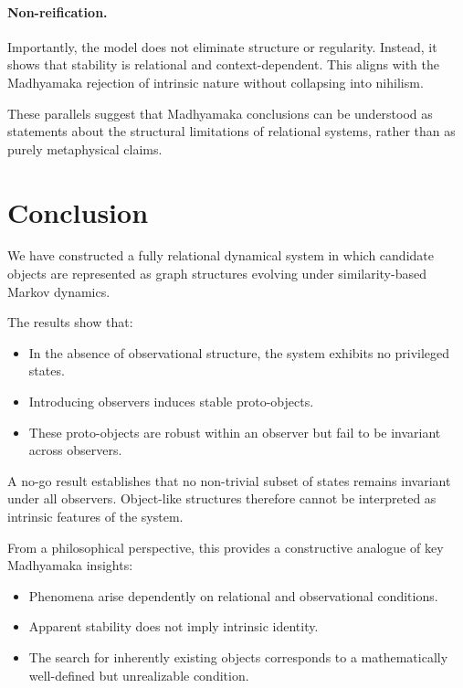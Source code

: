 \documentclass[11pt]{article}
\begin{document}
\paragraph{Non-reification.}
Importantly, the model does not eliminate structure or regularity. Instead, it shows that stability is relational and context-dependent. This aligns with the Madhyamaka rejection of intrinsic nature without collapsing into nihilism.

These parallels suggest that Madhyamaka conclusions can be understood as statements about the structural limitations of relational systems, rather than as purely metaphysical claims.

\section{Conclusion}

We have constructed a fully relational dynamical system in which candidate objects are represented as graph structures evolving under similarity-based Markov dynamics.

The results show that:

\begin{itemize}
    \item In the absence of observational structure, the system exhibits no privileged states.
    \item Introducing observers induces stable proto-objects.
    \item These proto-objects are robust within an observer but fail to be invariant across observers.
\end{itemize}

A no-go result establishes that no non-trivial subset of states remains invariant under all observers. Object-like structures therefore cannot be interpreted as intrinsic features of the system.

From a philosophical perspective, this provides a constructive analogue of key Madhyamaka insights:

\begin{itemize}
    \item Phenomena arise dependently on relational and observational conditions.
    \item Apparent stability does not imply intrinsic identity.
    \item The search for inherently existing objects corresponds to a mathematically well-defined but unrealizable condition.
\end{itemize}
\end{document}
